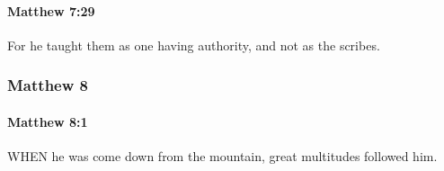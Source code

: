 		\paragraph{Matthew 7:29} %
			\label{MATTHEW-7-29}

			For he taught them as one having authority, and not as the scribes.

			\begin{framed}
			\scriptsize
				\begin{compactdesc}
					\item[SBLG]  \hyperref[EXOUSIA]{} 
				\end{compactdesc}
			\end{framed}

	\subsubsection{Matthew 8} %
		\label{MATTHEW-8}
		
		\paragraph{Matthew 8:1} %
			\label{MATTHEW-8-1}

			WHEN he was come down from the mountain, great multitudes followed him.


